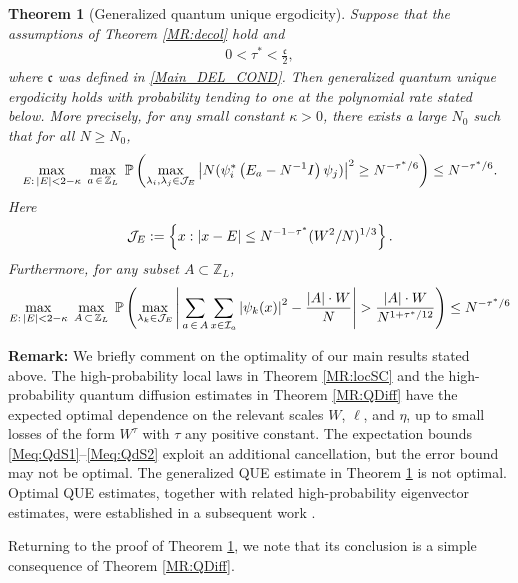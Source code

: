 \documentclass[10pt,reqno]{article}
\theoremstyle{plain} %
\newtheorem{theorem}{Theorem}[section]
\theoremstyle{remark}
\numberwithin{equation}{section}
\begin{document}
 
\begin{theorem}[Generalized quantum unique ergodicity]\label{MR:QUE} 
Suppose that the assumptions of Theorem \ref{MR:decol} hold and 
\begin{align}\label{tau} 
0< \tau ^*<  \frac {  \mathfrak c } 2, 
\end{align} 
where $ \mathfrak c$ was defined in \eqref{Main_DEL_COND}.
Then generalized quantum unique ergodicity holds with probability tending to one at the polynomial rate stated below. More precisely, for any small constant $\kappa>0$, there exists a large $N_0$ such that for all $N \geqslant N_0$, 
\begin{equation}\label{Meq:QUE}
\max_{E: \,|E|<2-\kappa}\; 
\max_{ a\,\in\, \mathbb Z_L}\;\mathbb{P}\left(\max_{\lambda_i,\lambda_j\in {\cal J}_E} 
 \left|N (\psi_i^*\left(E_a-N^{-1}I\right) \psi_j)\right|^2 \ge N^{-\tau ^*/6} \right) \le  N^{-\tau ^*/6}.
\end{equation}
Here 
$${\cal J}_E:=\left\{x: |x-E|\le N^{-1-\tau ^*} (W^2/N)^{1/3}\right\}.
$$
Furthermore, for  any  subset $A\subset \mathbb Z_L$,
\begin{equation}\label{Meq:QUE2}
\max_{E: \,|E|<2-\kappa}\; 
\max_{ A\,\subset\, \mathbb Z_L}\;\mathbb{P}\left(\max_{\lambda_k\in {\cal J}_E} 
\left|\,\sum_{a\,\in\, A}\sum_{x\in {\cal I}_a}\left|\psi_k(x)\right |^2 -\frac{|A|\cdot W}{N}\right| > \frac{|A|\cdot W}{N^{1+\tau ^*/12}}  \right) \le N^{-\tau ^*/6}
\end{equation}

 

\end{theorem}
\begingroup
 

 \noindent  
{\bf Remark:} We briefly comment on the optimality of our main results stated above. The high-probability local laws in Theorem \ref{MR:locSC} and the
high-probability quantum diffusion estimates in Theorem \ref{MR:QDiff}
have the expected optimal dependence on the relevant scales $W$, $\ell$,
and $\eta$, up to small  losses of the form  $W^\tau$
with $\tau$ any positive constant. The 
expectation bounds \eqref{Meq:QdS1}--\eqref{Meq:QdS2} exploit an additional
cancellation, but  the error bound may not be optimal. The generalized QUE estimate in Theorem \ref{MR:QUE} is not
optimal. Optimal QUE estimates, together with related high-probability eigenvector estimates, were established
in a subsequent work
\cite{ErdosRiabov2025Zigzag}. 
\par\endgroup

Returning to the proof of Theorem \ref{MR:QUE}, we note that its conclusion is a simple consequence of Theorem \ref{MR:QDiff}.
\end{document}

